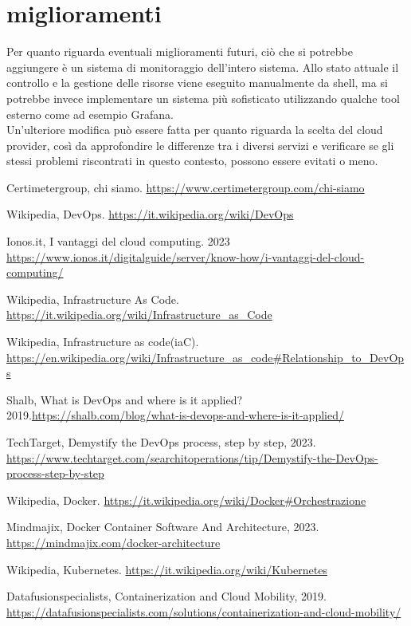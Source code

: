 \documentclass[a4paper,12pt]{report}
\begin{document}
\section{miglioramenti}
Per quanto riguarda eventuali miglioramenti futuri, ciò che si potrebbe aggiungere è un sistema di monitoraggio dell'intero sistema. Allo stato attuale il controllo e la gestione delle risorse viene eseguito manualmente da shell, ma si potrebbe invece implementare un sistema più sofisticato utilizzando qualche tool esterno come ad esempio Grafana.\\
Un'ulteriore modifica può essere fatta per quanto riguarda la scelta del cloud provider, così da approfondire le differenze tra i diversi servizi e verificare se gli stessi problemi riscontrati in questo contesto, possono essere evitati o meno.
%
%
\begin{thebibliography}{00}
%

Certimetergroup, chi siamo. \url{https://www.certimetergroup.com/chi-siamo}

Wikipedia, DevOps. \url{https://it.wikipedia.org/wiki/DevOps}

Ionos.it, I vantaggi del cloud computing. 2023 \url{https://www.ionos.it/digitalguide/server/know-how/i-vantaggi-del-cloud-computing/}


Wikipedia, Infrastructure As Code. \url{https://it.wikipedia.org/wiki/Infrastructure_as_Code}

Wikipedia, Infrastructure as code(iaC). \url{https://en.wikipedia.org/wiki/Infrastructure_as_code#Relationship_to_DevOps}

Shalb, What is DevOps and where is it applied? 2019.\url{https://shalb.com/blog/what-is-devops-and-where-is-it-applied/}


TechTarget, Demystify the DevOps process, step by step, 2023. \url{https://www.techtarget.com/searchitoperations/tip/Demystify-the-DevOps-process-step-by-step}

Wikipedia, Docker. \url{https://it.wikipedia.org/wiki/Docker#Orchestrazione}

Mindmajix, Docker Container Software And Architecture, 2023. \url{https://mindmajix.com/docker-architecture}

Wikipedia, Kubernetes. \url{https://it.wikipedia.org/wiki/Kubernetes}

Datafusionspecialists, Containerization and Cloud Mobility, 2019. \url{https://datafusionspecialists.com/solutions/containerization-and-cloud-mobility/}


\end{thebibliography}
\end{document}
